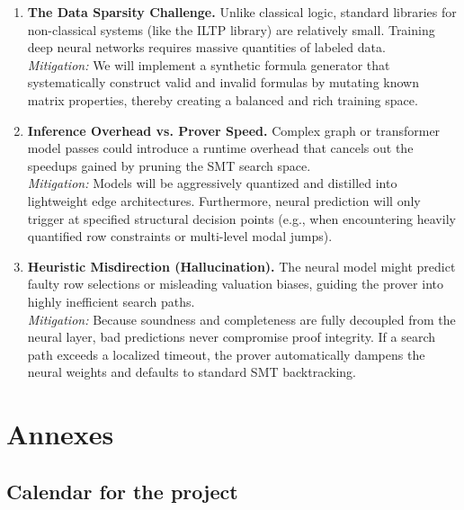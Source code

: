 \documentclass[a4paper]{article}
\begin{document}
\begin{enumerate}
    \item \textbf{The Data Sparsity Challenge.} Unlike classical logic, standard libraries for non-classical systems (like the ILTP library) are relatively small. Training deep neural networks requires massive quantities of labeled data.
    \\[1ex] \textit{Mitigation:} We will implement a synthetic formula generator that systematically construct valid and invalid formulas by mutating known matrix properties, thereby creating a balanced and rich training space.
    \item \textbf{Inference Overhead vs. Prover Speed.} Complex graph or transformer model passes could introduce a runtime overhead that cancels out the speedups gained by pruning the SMT search space.
    \\[1ex] \textit{Mitigation:} Models will be aggressively quantized and distilled into lightweight edge architectures. Furthermore, neural prediction will only trigger at specified structural decision points (e.g., when encountering heavily quantified row constraints or multi-level modal jumps).
    \item \textbf{Heuristic Misdirection (Hallucination).} The neural model might predict faulty row selections or misleading valuation biases, guiding the prover into highly inefficient search paths.
    \\[1ex] \textit{Mitigation:} Because soundness and completeness are fully decoupled from the neural layer, bad predictions never compromise proof integrity. If a search path exceeds a localized timeout, the prover automatically dampens the neural weights and defaults to standard SMT backtracking.
\end{enumerate}

\pagebreak

\section*{Annexes}

\subsection*{Calendar for the project}
\end{document}
